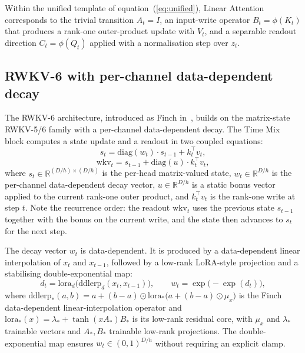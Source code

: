 Within the unified template of equation~(\ref{eq:unified}),
Linear Attention corresponds to the trivial transition
$A_{t} = I$, an input-write operator $B_{t} = \phi(K_{t})$ that
produces a rank-one outer-product update with $V_{t}$, and a
separable readout direction $C_{t} = \phi(Q_{t})$ applied with a
normalisation step over $z_{t}$.

\subsection{RWKV-6 with per-channel data-dependent decay}\label{sec:backbones:rwkv6}

The RWKV-6 architecture, introduced as Finch
in~\citet{peng2024eaglefinch}, builds on the matrix-state RWKV-5/6
family with a per-channel data-dependent decay. The Time Mix block
computes a state update and a readout in two coupled equations:
\begin{equation}\label{eq:rwkv6-state}
s_{t} = \mathrm{diag}(w_{t}) \cdot s_{t-1} + k_{t}^{\top} v_{t},
\end{equation}
\begin{equation}\label{eq:rwkv6-readout}
\mathrm{wkv}_{t} = s_{t-1} + \mathrm{diag}(u) \cdot k_{t}^{\top} v_{t},
\end{equation}
where $s_{t} \in \mathbb{R}^{(D/h) \times (D/h)}$ is the per-head
matrix-valued state, $w_{t} \in \mathbb{R}^{D/h}$ is the per-channel
data-dependent decay vector, $u \in \mathbb{R}^{D/h}$ is a static
bonus vector applied to the current rank-one outer product, and
$k_{t}^{\top} v_{t}$ is the rank-one write at step $t$. Note the
recurrence order: the readout $\mathrm{wkv}_{t}$ uses the previous
state $s_{t-1}$ together with the bonus on the current write, and the
state then advances to $s_{t}$ for the next step.

The decay vector $w_{t}$ is data-dependent. It is produced by a
data-dependent linear interpolation of $x_{t}$ and $x_{t-1}$,
followed by a low-rank LoRA-style projection and a stabilising
double-exponential map:
\begin{equation}\label{eq:rwkv6-decay}
d_{t} = \mathrm{lora}_{d}\!\big(\mathrm{ddlerp}_{d}(x_{t}, x_{t-1})\big),
\qquad w_{t} = \exp\!\big({-}\exp(d_{t})\big),
\end{equation}
where $\mathrm{ddlerp}_{\ast}(a, b) = a + (b - a) \odot \mathrm{lora}_{\ast}\!\big(a + (b - a) \odot \mu_{x}\big)$
is the Finch data-dependent linear-interpolation operator and
$\mathrm{lora}_{\ast}(x) = \lambda_{\ast} + \tanh(x A_{\ast}) B_{\ast}$
is its low-rank residual core, with $\mu_{x}$ and $\lambda_{\ast}$
trainable vectors and $A_{\ast}, B_{\ast}$ trainable low-rank
projections. The double-exponential map ensures $w_{t} \in (0, 1)^{D/h}$
without requiring an explicit clamp.


